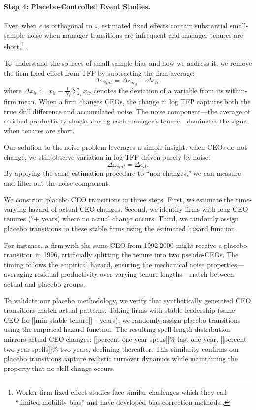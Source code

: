 \documentclass[11pt,a4paper]{article}
\begin{document}
\paragraph{Step 4: Placebo-Controlled Event Studies.} Even when $\epsilon$ is orthogonal to $z$, estimated fixed effects contain substantial small-sample noise when manager transitions are infrequent and manager tenures are short.\footnote{Worker-firm fixed effect studies face similar challenges which they call ``limited mobility bias'' \citep{andrews2008high} and have developed bias-correction methods \citep{Bonhomme2023-dx, gaure2014correlation}. }

To understand the sources of small-sample bias and how we address it, we remove the firm fixed effect from TFP by subtracting the firm average:
\begin{equation}
\Delta\omega_{imt} = \Delta z_{m_{it}} + \Delta\epsilon_{it},
\end{equation}
where $\Delta x_{it} := x_{it} - \frac{1}{N_i}\sum_{\tau} x_{i\tau}$ denotes the deviation of a variable from its within-firm mean. When a firm changes CEOs, the change in log TFP captures both the true skill difference and accumulated noise. The noise component---the average of residual productivity shocks during each manager's tenure---dominates the signal when tenures are short. 

Our solution to the noise problem leverages a simple insight: when CEOs do not change, we still observe variation in log TFP driven purely by noise:
\begin{equation}
\Delta\omega_{imt} = \Delta\epsilon_{it}.
\end{equation}
By applying the same estimation procedure to ``non-changes,'' we can measure and filter out the noise component.

We construct placebo CEO transitions in three steps. First, we estimate the time-varying hazard of actual CEO changes. Second, we identify firms with long CEO tenures (7+ years) where no actual change occurs. Third, we randomly assign placebo transitions to these stable firms using the estimated hazard function.

For instance, a firm with the same CEO from 1992-2000 might receive a placebo transition in 1996, artificially splitting the tenure into two pseudo-CEOs. The timing follows the empirical hazard, ensuring the mechanical noise properties—averaging residual productivity over varying tenure lengths—match between actual and placebo groups.

To validate our placebo methodology, we verify that synthetically generated CEO transitions match actual patterns. Taking firms with stable leadership (same CEO for [[min stable tenure]]+ years), we randomly assign placebo transitions using the empirical hazard function. The resulting spell length distribution mirrors actual CEO changes: [[percent one year spells]]\% last one year, [[percent two year spells]]\% two years, declining thereafter. This similarity confirms our placebo transitions capture realistic turnover dynamics while maintaining the property that no skill change occurs.
\end{document}
